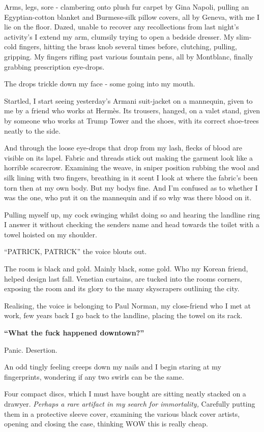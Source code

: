 \documentclass[19pt,openany]{book}
\begin{document}
Arms, legs, sore - clambering onto plush
fur carpet by Gina Napoli, pulling an
Egyptian-cotton blanket
and Burmese-silk pillow covers,
all by Geneva, with me I lie
on the floor.
Dazed, unable to recover any
recollections from last night's
activity's I extend my arm,
clumsily trying to open
a bedside dresser. My slim-cold fingers,
hitting the brass knob several
times before, clutching, pulling,
gripping. My fingers rifling
past various fountain pens,
all by Montblanc, finally grabbing
prescription eye-drops.

The drops trickle down my face -
some going into my mouth.

Startled, I start
seeing yesterday's
Armani suit-jacket
on a mannequin, given
to me by a friend who works
at Hermès. Its trousers, hanged, on
a valet stand, given by someone who
works at Trump Tower and the shoes,
with its correct shoe-trees
neatly to the side.

And through
the loose eye-drops that drop
from my lash,
flecks of blood
are visible on its lapel. Fabric
and threads stick out making
the garment look like a horrible
scarecrow. Examining the weave,
in sniper position rubbing the
wool and silk lining
with two fingers, breathing
in it scent I look at where
the fabric's been torn then at
my own body.
But my bodys fine. And
I'm confused as to whether I was
the one, who put it on the mannequin
and if so why was there blood on it.

Pulling myself up,
my cock swinging whilst doing so
and hearing the
landline ring I answer it
without checking the senders name
and head towards the toilet with
a towel hoisted on my shoulder.

``PATRICK, PATRICK'' the
voice blouts out.

The room is black and gold. Mainly
black, some gold. Who my Korean
friend, helped design last fall.
Venetian curtains, are tucked
into the rooms corners,
exposing the room and its glory
to the many skyscrapers outlining
the city.

Realising, the voice
is belonging to Paul Norman, my close-friend
who I met at work, few years back I
go back to the landline, placing the
towel on its rack.

\textbf{``What the fuck happened downtown?''}

Panic. Desertion.

An odd tingly
feeling creeps down my nails and
I begin staring at my fingerprints,
wondering if any two swirls can be
the same.

Four compact discs, which
I must have bought are
sitting neatly stacked on a drawyer.
\textit{Perhaps a rare
artifact in my search for immortality,}
Carefully putting them in a protective
sleeve cover, examining the various black
cover artists, opening and closing
the case, thinking WOW this is really
cheap.
\end{document}
